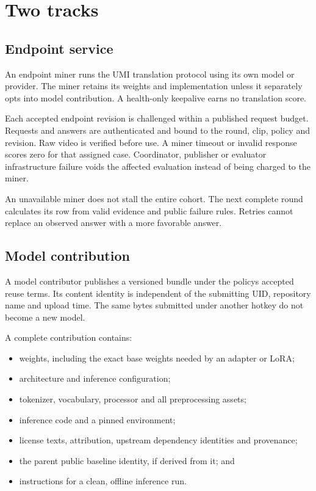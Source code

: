\section{Two tracks}\label{3-two-tracks}

\subsection{Endpoint service}\label{31-endpoint-service}

An endpoint miner runs the UMI translation protocol using its own model or
provider. The miner retains its weights and implementation unless it separately
opts into model contribution. A health-only keepalive earns no translation score.

Each accepted endpoint revision is challenged within a published request
budget. Requests and answers are authenticated and bound to the round, clip,
policy and revision. Raw video is verified before use. A miner timeout or
invalid response scores zero for that assigned case. Coordinator, publisher
or evaluator infrastructure failure voids the affected evaluation instead of
being charged to the miner.

An unavailable miner does not stall the entire cohort. The next complete
round calculates its row from valid evidence and public failure rules.
Retries cannot replace an observed answer with a more favorable answer.

\subsection{Model contribution}\label{32-model-contribution}

A model contributor publishes a versioned bundle under the policy\textquotesingle s accepted
reuse terms. Its content identity is independent of the submitting UID,
repository name and upload time. The same bytes submitted under another
hotkey do not become a new model.

A complete contribution contains:

\begin{itemize}
\tightlist
\item
  weights, including the exact base weights needed by an adapter or LoRA;
\item
  architecture and inference configuration;
\item
  tokenizer, vocabulary, processor and all preprocessing assets;
\item
  inference code and a pinned environment;
\item
  license texts, attribution, upstream dependency identities and provenance;
\item
  the parent public baseline identity, if derived from it; and
\item
  instructions for a clean, offline inference run.
\end{itemize}

